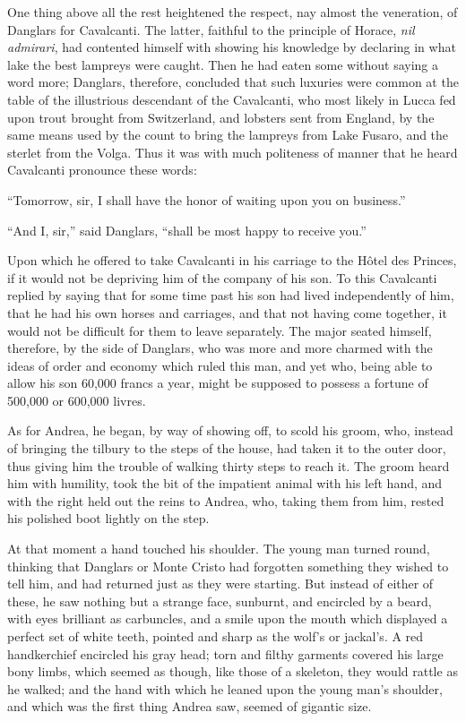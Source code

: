 One thing above all the rest heightened the respect, nay almost the
veneration, of Danglars for Cavalcanti. The latter, faithful to the
principle of Horace, \textit{nil admirari}, had contented himself with showing
his knowledge by declaring in what lake the best lampreys were caught.
Then he had eaten some without saying a word more; Danglars, therefore,
concluded that such luxuries were common at the table of the
illustrious descendant of the Cavalcanti, who most likely in Lucca fed
upon trout brought from Switzerland, and lobsters sent from England, by
the same means used by the count to bring the lampreys from Lake
Fusaro, and the sterlet from the Volga. Thus it was with much
politeness of manner that he heard Cavalcanti pronounce these words:

“Tomorrow, sir, I shall have the honor of waiting upon you on
business.”

“And I, sir,” said Danglars, “shall be most happy to receive you.”

Upon which he offered to take Cavalcanti in his carriage to the Hôtel
des Princes, if it would not be depriving him of the company of his
son. To this Cavalcanti replied by saying that for some time past his
son had lived independently of him, that he had his own horses and
carriages, and that not having come together, it would not be difficult
for them to leave separately. The major seated himself, therefore, by
the side of Danglars, who was more and more charmed with the ideas of
order and economy which ruled this man, and yet who, being able to
allow his son 60,000 francs a year, might be supposed to possess a
fortune of 500,000 or 600,000 livres.

As for Andrea, he began, by way of showing off, to scold his groom,
who, instead of bringing the tilbury to the steps of the house, had
taken it to the outer door, thus giving him the trouble of walking
thirty steps to reach it. The groom heard him with humility, took the
bit of the impatient animal with his left hand, and with the right held
out the reins to Andrea, who, taking them from him, rested his polished
boot lightly on the step.

At that moment a hand touched his shoulder. The young man turned round,
thinking that Danglars or Monte Cristo had forgotten something they
wished to tell him, and had returned just as they were starting. But
instead of either of these, he saw nothing but a strange face,
sunburnt, and encircled by a beard, with eyes brilliant as carbuncles,
and a smile upon the mouth which displayed a perfect set of white
teeth, pointed and sharp as the wolf’s or jackal’s. A red handkerchief
encircled his gray head; torn and filthy garments covered his large
bony limbs, which seemed as though, like those of a skeleton, they
would rattle as he walked; and the hand with which he leaned upon the
young man’s shoulder, and which was the first thing Andrea saw, seemed
of gigantic size.

